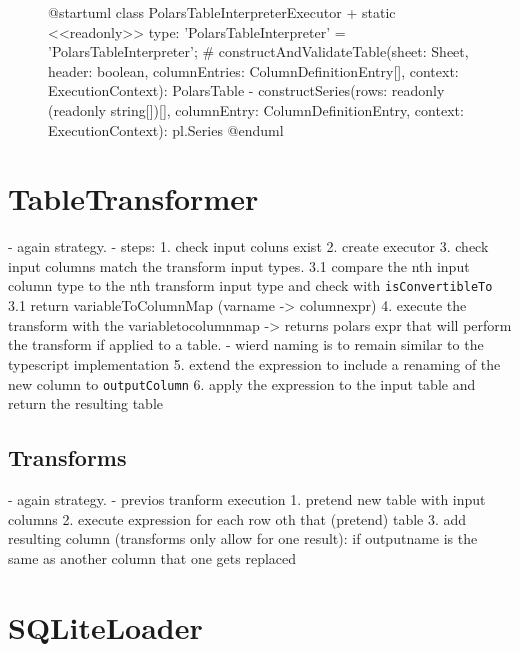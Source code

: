 \begin{figure}
	\begin{plantuml}
		@startuml
		class PolarsTableInterpreterExecutor {
		+ {static} <<readonly>> type: 'PolarsTableInterpreter' = 'PolarsTableInterpreter';
		# constructAndValidateTable(sheet: Sheet, header: boolean, columnEntries: ColumnDefinitionEntry[], context: ExecutionContext): PolarsTable
		- constructSeries(rows: readonly (readonly string[])[], columnEntry: ColumnDefinitionEntry, context: ExecutionContext): pl.Series
		}
		@enduml
	\end{plantuml}
	\caption{}\label{fig:polarstableinterpreter_uml}
\end{figure}



\section{TableTransformer}
- again strategy.
- steps:
1. check input coluns exist
2. create executor
3. check input columns match the transform input types.
3.1 compare the nth input column type to the nth transform input type and check with \Verb|isConvertibleTo|
3.1 return variableToColumnMap (varname -> columnexpr)
4. execute the transform with the variabletocolumnmap -> returns polars expr that will perform the transform if applied to a table.
- wierd naming is to remain similar to the typescript implementation
5. extend the expression to include a renaming of the new column to \Verb|outputColumn|
6. apply the expression to the input table and return the resulting table

\subsection{Transforms}
- again strategy.
- previos tranform execution
1. pretend new table with input columns
2. execute expression for each row oth that (pretend) table
3. add resulting column (transforms only allow for one result): if outputname is the same as another column that one gets replaced





\section{SQLiteLoader}





